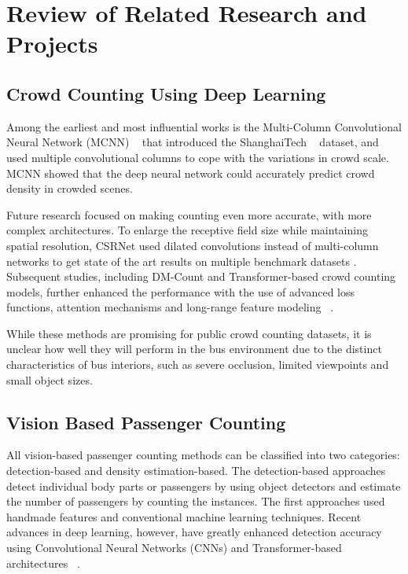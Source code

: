 \section{Review of Related Research and Projects}

\subsection{Crowd Counting Using Deep Learning}

Among the earliest and most influential works is the Multi-Column Convolutional Neural Network (MCNN) ~\cite{Zhang2016} that introduced the ShanghaiTech ~\cite{Zhu2020} dataset, and used multiple convolutional columns to cope with the variations in crowd scale. MCNN showed that the deep neural network could accurately predict crowd density in crowded scenes.

Future research focused on making counting even more accurate, with more complex architectures. To enlarge the receptive field size while maintaining spatial resolution, CSRNet used dilated convolutions instead of multi-column networks to get state of the art results on multiple benchmark datasets \cite{li2018csrnet} . Subsequent studies, including DM-Count and Transformer-based crowd counting models, further enhanced the performance with the use of advanced loss functions, attention mechanisms and long-range feature modeling ~\cite{wang2020dmcount}.

While these methods are promising for public crowd counting datasets, it is unclear how well they will perform in the bus environment due to the distinct characteristics of bus interiors, such as severe occlusion, limited viewpoints and small object sizes.

\subsection{Vision Based Passenger Counting}

All vision-based passenger counting methods can be classified into two categories: detection-based and density estimation-based. The detection-based approaches detect individual body parts or passengers by using object detectors and estimate the number of passengers by counting the instances. The first approaches used handmade features and conventional machine learning techniques. Recent advances in deep learning, however, have greatly enhanced detection accuracy using Convolutional Neural Networks (CNNs) and Transformer-based architectures ~\cite{sindagi2018survey}.


